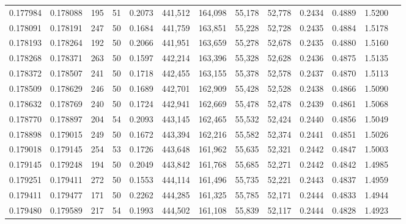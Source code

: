 \begin{tabular}{rrrrrrrrrrrrr}
0.177984 & 0.178088 &   195 &  51 &                                     0.2073 & 441,512 & 164,098 &  55,178 &  52,778 & 0.2434 & 0.4889 & 1.5200 \\
0.178091 & 0.178191 &   247 &  50 &                                     0.1684 & 441,759 & 163,851 &  55,228 &  52,728 & 0.2435 & 0.4884 & 1.5178 \\
0.178193 & 0.178264 &   192 &  50 &                                     0.2066 & 441,951 & 163,659 &  55,278 &  52,678 & 0.2435 & 0.4880 & 1.5160 \\
0.178268 & 0.178371 &   263 &  50 &                                     0.1597 & 442,214 & 163,396 &  55,328 &  52,628 & 0.2436 & 0.4875 & 1.5135 \\
0.178372 & 0.178507 &   241 &  50 &                                     0.1718 & 442,455 & 163,155 &  55,378 &  52,578 & 0.2437 & 0.4870 & 1.5113 \\
0.178509 & 0.178629 &   246 &  50 &                                     0.1689 & 442,701 & 162,909 &  55,428 &  52,528 & 0.2438 & 0.4866 & 1.5090 \\
0.178632 & 0.178769 &   240 &  50 &                                     0.1724 & 442,941 & 162,669 &  55,478 &  52,478 & 0.2439 & 0.4861 & 1.5068 \\
0.178770 & 0.178897 &   204 &  54 &                                     0.2093 & 443,145 & 162,465 &  55,532 &  52,424 & 0.2440 & 0.4856 & 1.5049 \\
0.178898 & 0.179015 &   249 &  50 &                                     0.1672 & 443,394 & 162,216 &  55,582 &  52,374 & 0.2441 & 0.4851 & 1.5026 \\
0.179018 & 0.179145 &   254 &  53 &                                     0.1726 & 443,648 & 161,962 &  55,635 &  52,321 & 0.2442 & 0.4847 & 1.5003 \\
0.179145 & 0.179248 &   194 &  50 &                                     0.2049 & 443,842 & 161,768 &  55,685 &  52,271 & 0.2442 & 0.4842 & 1.4985 \\
0.179251 & 0.179411 &   272 &  50 &                                     0.1553 & 444,114 & 161,496 &  55,735 &  52,221 & 0.2443 & 0.4837 & 1.4959 \\
0.179411 & 0.179477 &   171 &  50 &                                     0.2262 & 444,285 & 161,325 &  55,785 &  52,171 & 0.2444 & 0.4833 & 1.4944 \\
0.179480 & 0.179589 &   217 &  54 &                                     0.1993 & 444,502 & 161,108 &  55,839 &  52,117 & 0.2444 & 0.4828 & 1.4923 \\

\end{tabular}
